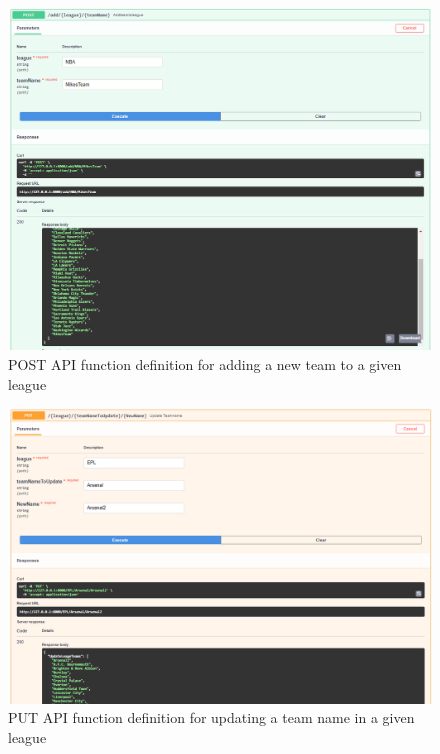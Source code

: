 \documentclass[12pt, letterpaper, final, onecolumn, titlepage] {article}
\begin{document}
\begin{figure}[htbp]
	\centerline{\includegraphics[scale=.4]{4/Post_mikesteam.png}}
	\caption{POST API function definition for adding a new team to a given league}
	\label{postTeam}
\end{figure}

\begin{figure}[htbp]
	\centerline{\includegraphics[scale=.4]{4/put_Arsenal2.png}}
	\caption{PUT API function definition for updating a team name in a given league}
	\label{putTeam}
\end{figure}
\end{document}
